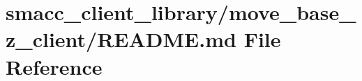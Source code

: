 \hypertarget{smacc__client__library_2move__base__z__client_2README_8md}{}\section{smacc\+\_\+client\+\_\+library/move\+\_\+base\+\_\+z\+\_\+client/\+R\+E\+A\+D\+ME.md File Reference}
\label{smacc__client__library_2move__base__z__client_2README_8md}
